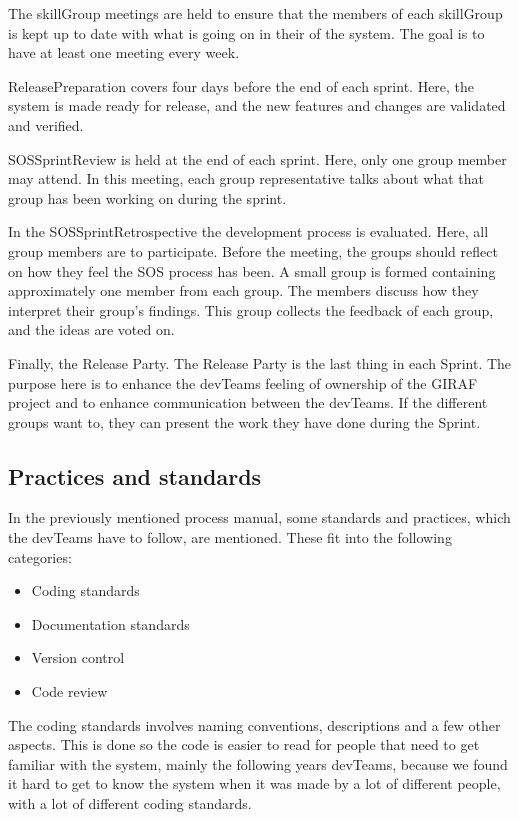 The \Gls{skillGroup} meetings are held to ensure that the members of each \gls{skillGroup} is kept up to date with what is going on in their of the system. The goal is to have at least one meeting every week. 

\Gls{ReleasePreparation} covers four days before the end of each sprint. Here, the system is made ready for release, and the new features and changes are validated and verified. 

\Gls{SOSSprintReview} is held at the end of each sprint. Here, only one group member may attend. In this meeting, each group representative talks about what that group has been working on during the sprint.

In the \gls{SOSSprintRetrospective} the development process is evaluated. Here, all group members are to participate. Before the meeting, the groups should reflect on how they feel the \gls{SOS} process has been. A small group is formed containing approximately one member from each group. The members discuss how they interpret their group's findings. This group collects the feedback of each group, and the ideas are voted on. 

Finally, the Release Party. The Release Party is the last thing in each Sprint. The purpose here is to enhance the \glspl{devTeam} feeling of ownership of the GIRAF project and to enhance communication between the \glspl{devTeam}. If the different groups want to, they can present the work they have done during the Sprint.

\subsection{Practices and standards} 

In the previously mentioned process manual, some standards and practices, which the \glspl{devTeam} have to follow, are mentioned. These fit into the following categories:

\begin{itemize}
    \item Coding standards
    \item Documentation standards
    \item Version control
    \item Code review
\end{itemize}

The coding standards involves naming conventions, descriptions and a few other aspects. This is done so the code is easier to read for people that need to get familiar with the system, mainly the following years \glspl{devTeam}, because we found it hard to get to know the system when it was made by a lot of different people, with a lot of different coding standards.


